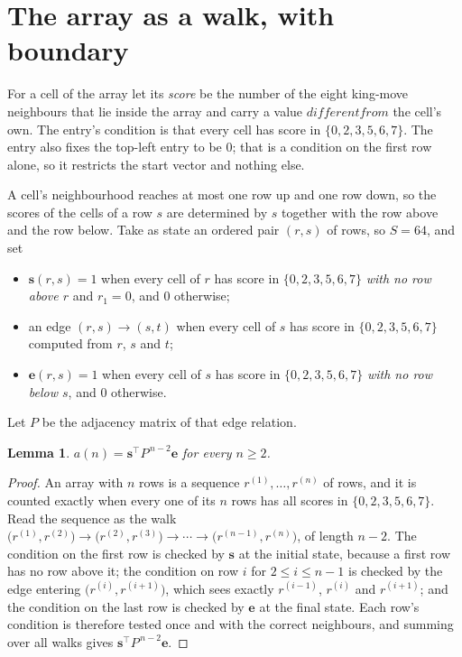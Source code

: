 \documentclass[11pt,a4paper]{article}
\theoremstyle{plain}
\newtheorem{lemma}[theorem]{Lemma}
\theoremstyle{definition}
\begin{document}
\section{The array as a walk, with boundary}

For a cell of the array let its \emph{score} be the number of the eight king-move neighbours that lie inside
the array and carry a value $different from$ the cell's own. The entry's condition is that every cell
has score in $\{0,2,3,5,6,7\}$. The entry also fixes the top-left entry to be $0$; that is a condition on the first row alone, so it restricts the start vector and nothing else.

A cell's neighbourhood reaches at most one row up and one row down, so the scores of the
cells of a row $s$ are determined by $s$ together with the row above and the row below.
Take as state an ordered pair $(r,s)$ of rows, so $S=64$, and set
\begin{itemize}
\item $\mathbf{s}(r,s)=1$ when every cell of $r$ has score in $\{0,2,3,5,6,7\}$ \emph{with no row
above $r$} and $r_1=0$, and $0$ otherwise;
\item an edge $(r,s)\to(s,t)$ when every cell of $s$ has score in $\{0,2,3,5,6,7\}$ computed from
$r$, $s$ and $t$;
\item $\mathbf{e}(r,s)=1$ when every cell of $s$ has score in $\{0,2,3,5,6,7\}$ \emph{with no row
below $s$}, and $0$ otherwise.
\end{itemize}
Let $P$ be the adjacency matrix of that edge relation.

\begin{lemma}\label{lem:walk}
$a(n)=\mathbf{s}^{\!\top}P^{\,n-2}\mathbf{e}$ for every $n\ge2$.
\end{lemma}

\begin{proof}
An array with $n$ rows is a sequence $r^{(1)},\dots,r^{(n)}$ of rows, and it is counted
exactly when every one of its $n$ rows has all scores in $\{0,2,3,5,6,7\}$. Read the sequence as the
walk $\bigl(r^{(1)},r^{(2)}\bigr)\to\bigl(r^{(2)},r^{(3)}\bigr)\to\cdots\to
\bigl(r^{(n-1)},r^{(n)}\bigr)$, of length $n-2$. The condition on the first row is
checked by $\mathbf{s}$ at the initial state, because a first row has no row above it; the
condition on row $i$ for $2\le i\le n-1$ is checked by the edge entering
$\bigl(r^{(i)},r^{(i+1)}\bigr)$, which sees exactly $r^{(i-1)}$, $r^{(i)}$ and
$r^{(i+1)}$; and the condition on the last row is checked by $\mathbf{e}$ at the final
state. Each row's condition is therefore tested once and with the correct neighbours, and
summing over all walks gives $\mathbf{s}^{\!\top}P^{\,n-2}\mathbf{e}$.
\end{proof}
\end{document}
